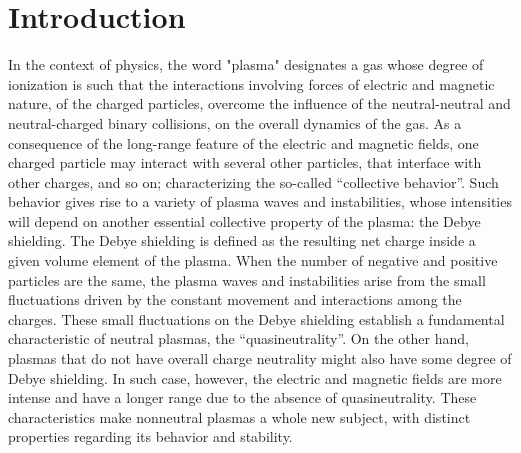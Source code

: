 \documentclass[12pt,a4paper,ruledheader]{report}
\begin{document}
\chapter{Introduction}
\label{cha:intro}
%
%
%
In the context of physics, the word "plasma" designates a gas whose degree of
ionization is such that the interactions involving forces of electric and magnetic
nature, of the charged particles, overcome the influence of the neutral-neutral
and neutral-charged binary collisions, on the overall dynamics of the gas. As a
consequence of the long-range feature of the electric and magnetic fields, one
charged particle may interact with several other particles, that interface with
other charges, and so on; characterizing the so-called ``collective behavior''.
Such behavior gives rise to a variety of plasma waves and instabilities, whose
intensities will depend on another essential collective property of the plasma:
the Debye shielding. The Debye shielding is defined as the resulting net charge
inside a given volume element of the plasma. When the number of negative and
positive particles are the same, the plasma waves and instabilities arise from
the small fluctuations driven by the constant movement and interactions among the
charges. These small fluctuations on the Debye shielding establish a fundamental
characteristic of neutral plasmas, the ``quasineutrality''. On the other hand,
plasmas that do not have overall charge neutrality might also have some degree
of Debye shielding. In such case, however, the electric and magnetic fields are
more intense and have a longer range due to the absence of quasineutrality.
These characteristics make nonneutral plasmas a whole new subject, with distinct
properties regarding its behavior and stability.
\end{document}
